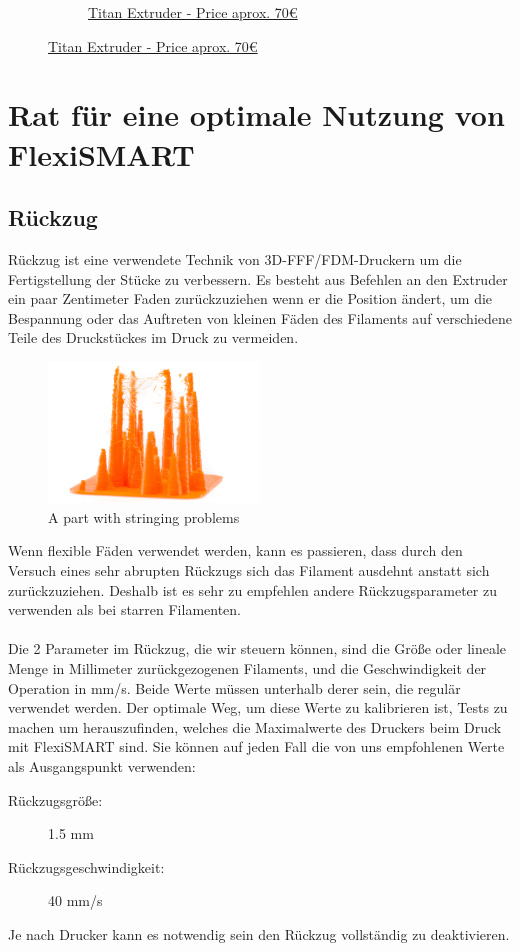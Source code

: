 \documentclass[11pt,a4paper]{article}
\begin{document}
\begin{figure}[H]
\begin{subfigure}[b]{0.4\textwidth}
		\caption*{\href{www.e3d-online.com}{{\footnotesize Titan Extruder - Price aprox. 70\euro}}}
    \end{subfigure}
\end{figure}
\section{Rat für eine optimale Nutzung von FlexiSMART}
	\subsection{Rückzug}
Rückzug ist eine verwendete Technik von 3D-FFF/FDM-Druckern um die Fertigstellung der Stücke zu verbessern. Es besteht aus Befehlen an den Extruder ein paar Zentimeter Faden zurückzuziehen wenn er die Position ändert, um die Bespannung oder das Auftreten von kleinen Fäden des Filaments auf verschiedene Teile des Druckstückes im Druck zu vermeiden.
\begin{figure}[H]
\centering
\includegraphics[width=0.5\textwidth,cfbox=azul_marcos 4pt 0pt]{FOTOS/RETRACCION1}
\caption*{A part with stringing problems}
\end{figure}
Wenn flexible Fäden verwendet werden, kann es passieren, dass durch den Versuch eines sehr abrupten Rückzugs sich das Filament ausdehnt anstatt sich zurückzuziehen. Deshalb ist es sehr zu empfehlen andere Rückzugsparameter zu verwenden als bei starren Filamenten.
\\\\
Die 2 Parameter im Rückzug, die wir steuern können, sind die Größe oder lineale Menge in Millimeter zurückgezogenen Filaments, und die Geschwindigkeit der Operation in mm/s. Beide Werte müssen unterhalb derer sein, die regulär verwendet werden. Der optimale Weg, um diese Werte zu kalibrieren ist, Tests zu machen um herauszufinden, welches die Maximalwerte des Druckers beim Druck mit FlexiSMART sind. Sie können auf jeden Fall die von uns empfohlenen Werte als Ausgangspunkt verwenden:
\begin{description}
\item [Rückzugsgröße:] 1.5 mm
\item [Rückzugsgeschwindigkeit:] 40 mm/s
\end{description}
Je nach Drucker kann es notwendig sein den Rückzug vollständig zu deaktivieren.
\end{document}
